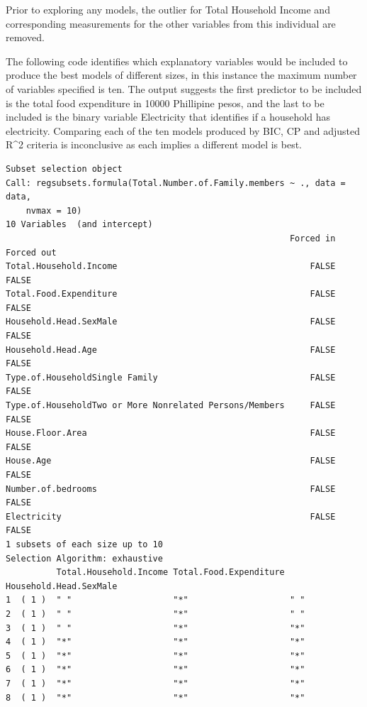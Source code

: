 \documentclass[
]{article}
\begin{document}
Prior to exploring any models, the outlier for Total Household Income
and corresponding measurements for the other variables from this
individual are removed.

The following code identifies which explanatory variables would be
included to produce the best models of different sizes, in this instance
the maximum number of variables specified is ten. The output suggests
the first predictor to be included is the total food expenditure in
10000 Phillipine pesos, and the last to be included is the binary
variable Electricity that identifies if a household has electricity.
Comparing each of the ten models produced by BIC, CP and adjusted R\^{}2
criteria is inconclusive as each implies a different model is best.

\begin{verbatim}
Subset selection object
Call: regsubsets.formula(Total.Number.of.Family.members ~ ., data = data, 
    nvmax = 10)
10 Variables  (and intercept)
                                                        Forced in Forced out
Total.Household.Income                                      FALSE      FALSE
Total.Food.Expenditure                                      FALSE      FALSE
Household.Head.SexMale                                      FALSE      FALSE
Household.Head.Age                                          FALSE      FALSE
Type.of.HouseholdSingle Family                              FALSE      FALSE
Type.of.HouseholdTwo or More Nonrelated Persons/Members     FALSE      FALSE
House.Floor.Area                                            FALSE      FALSE
House.Age                                                   FALSE      FALSE
Number.of.bedrooms                                          FALSE      FALSE
Electricity                                                 FALSE      FALSE
1 subsets of each size up to 10
Selection Algorithm: exhaustive
          Total.Household.Income Total.Food.Expenditure Household.Head.SexMale
1  ( 1 )  " "                    "*"                    " "                   
2  ( 1 )  " "                    "*"                    " "                   
3  ( 1 )  " "                    "*"                    "*"                   
4  ( 1 )  "*"                    "*"                    "*"                   
5  ( 1 )  "*"                    "*"                    "*"                   
6  ( 1 )  "*"                    "*"                    "*"                   
7  ( 1 )  "*"                    "*"                    "*"                   
8  ( 1 )  "*"                    "*"                    "*"                   

\end{verbatim}
\end{document}
